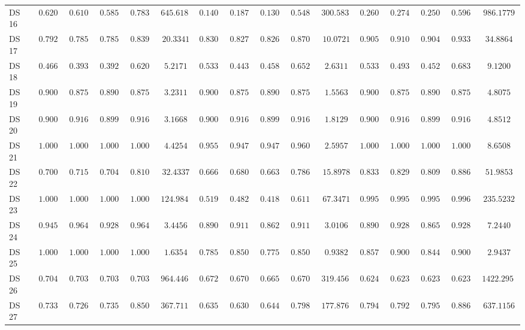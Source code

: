 {\begin{longtable}{|l|ccccc|ccccc|ccccc|}
		DS 16 & $\boldsymbol{0.6200}$ & $\boldsymbol{0.6100}$ & $\boldsymbol{0.5859}$ & $\boldsymbol{0.7833}$ & $645.6186$ & $0.1400$ & $0.1875$ & $0.1301$ & $0.5486$ & $300.5830$ & $0.2600$ & $0.2742$ & $0.2502$ & $0.5968$ & $986.1779$ \\
		DS 17 & $0.7925$ & $0.7857$ & $0.7857$ & $0.8393$ & $20.3341$ & $0.8302$ & $0.8274$ & $0.8268$ & $0.8705$ & $10.0721$ & $0.9057$ & $0.9107$ & $0.9042$ & $0.9330$ & $34.8864$ \\
		DS 18 & $0.4667$ & $0.3933$ & $0.3921$ & $0.6208$ & $5.2171$ & $0.5333$ & $0.4433$ & $0.4587$ & $0.6521$ & $2.6311$ & $0.5333$ & $0.4933$ & $0.4521$ & $0.6833$ & $9.1200$ \\
		DS 19 & $0.9000$ & $0.8750$ & $0.8901$ & $0.8750$ & $3.2311$ & $0.9000$ & $0.8750$ & $0.8901$ & $0.8750$ & $1.5563$ & $\boldsymbol{0.9000}$ & $\boldsymbol{0.8750}$ & $\boldsymbol{0.8901}$ & $\boldsymbol{0.8750}$ & $4.8075$ \\
		DS 20 & $0.9000$ & $0.9167$ & $0.8990$ & $0.9167$ & $3.1668$ & $0.9000$ & $0.9167$ & $0.8990$ & $0.9167$ & $1.8129$ & $0.9000$ & $0.9167$ & $0.8990$ & $0.9167$ & $4.8512$ \\
		DS 21 & $1.0000$ & $1.0000$ & $1.0000$ & $1.0000$ & $4.4254$ & $0.9556$ & $0.9475$ & $0.9475$ & $0.9606$ & $2.5957$ & $1.0000$ & $1.0000$ & $1.0000$ & $1.0000$ & $8.6508$ \\
		DS 22 & $0.7000$ & $0.7158$ & $0.7044$ & $0.8105$ & $32.4337$ & $0.6667$ & $0.6801$ & $0.6630$ & $0.7867$ & $15.8978$ & $0.8333$ & $\boldsymbol{0.8294}$ & $\boldsymbol{0.8092}$ & $\boldsymbol{0.8862}$ & $51.9853$ \\
		DS 23 & $1.0000$ & $1.0000$ & $1.0000$ & $1.0000$ & $124.9845$ & $0.5193$ & $0.4824$ & $0.4188$ & $0.6118$ & $67.3471$ & $0.9957$ & $0.9953$ & $0.9958$ & $0.9965$ & $235.5232$ \\
		DS 24 & $0.9451$ & $0.9643$ & $0.9283$ & $0.9643$ & $3.4456$ & $0.8901$ & $0.9119$ & $0.8621$ & $0.9119$ & $3.0106$ & $0.8901$ & $0.9286$ & $0.8654$ & $0.9286$ & $7.2440$ \\
		DS 25 & $1.0000$ & $1.0000$ & $1.0000$ & $1.0000$ & $1.6354$ & $0.7857$ & $0.8500$ & $0.7754$ & $0.8500$ & $0.9382$ & $0.8571$ & $0.9000$ & $0.8444$ & $0.9000$ & $2.9437$ \\
		DS 26 & $\boldsymbol{0.7040}$ & $\boldsymbol{0.7037}$ & $\boldsymbol{0.7033}$ & $\boldsymbol{0.7037}$ & $964.4463$ & $0.6720$ & $0.6709$ & $0.6651$ & $0.6709$ & $319.4569$ & $0.6240$ & $0.6238$ & $0.6236$ & $0.6238$ & $1422.2959$ \\
		DS 27 & $0.7333$ & $0.7264$ & $0.7355$ & $0.8508$ & $367.7111$ & $0.6359$ & $0.6300$ & $0.6445$ & $0.7982$ & $177.8769$ & $\boldsymbol{0.7949}$ & $\boldsymbol{0.7923}$ & $\boldsymbol{0.7950}$ & $\boldsymbol{0.8867}$ & $637.1156$ \\

\end{longtable}}
